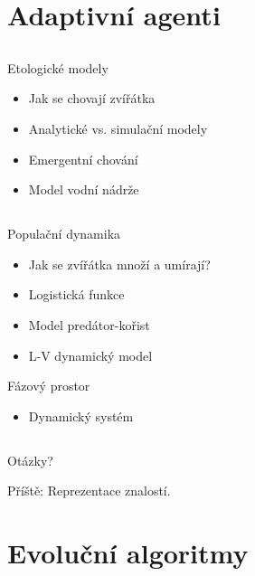 \documentclass{beamer}
\begin{document}
\section{Adaptivní agenti}

\subsection{}
\begin{frame}{Etologické modely}
\begin{itemize}
\item Jak se chovají zvířátka
\item Analytické vs. simulační modely
\item Emergentní chování
\item Model vodní nádrže
\end{itemize}
\end{frame}

\subsection{}
\begin{frame}{Populační dynamika}
\begin{itemize}
\item Jak se zvířátka množí a umírají?
\item Logistická funkce
\item Model predátor-kořist
\item L-V dynamický model
\end{itemize}
\begin{block}{Fázový prostor}
\begin{itemize}
\item Dynamický systém
\end{itemize}
\end{block}
\end{frame}

\subsection{}
\begin{frame}{Otázky?}
\begin{center}
Příště: Reprezentace znalostí.
\end{center}
\end{frame}

\section{Evoluční algoritmy}
\end{document}
